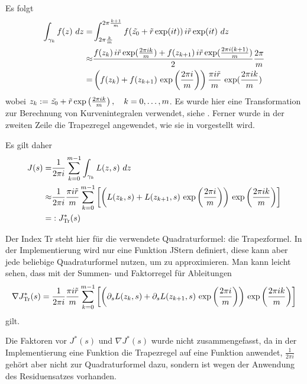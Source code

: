 \documentclass[a4paper,12pt]{report}
\newcommand{\zitat}[1]{\glqq #1\grqq}
\newcommand{\klammer}[1]{\left(#1\right)}
\newcommand{\1}{\mathds{1}}
\theoremstyle{plain} %
\theoremstyle{definition} %
\theoremstyle{remark}
\begin{document}
            Es folgt
            \begin{align}
                  \int_{\gamma_k} f(z)\ dz =& \int_{2 \pi \frac k m}^{2\pi \frac {k+1} m} f(\Tilde{z_0}+\Tilde r\exp(it))\,i\Tilde r\exp(it)\ dz\label{eqn: Teilintegral Kurve zu Intergral normal}\\
                  \approx& \frac{f(z_k)\,i\Tilde r\exp(\frac{2\pi i k}{m})+f(z_{k+1})\,i\Tilde r\exp(\frac{2\pi i (k+1)}{m})}{2} \frac{2\pi} m\nonumber\\
                  =& \klammer{f(z_k)+f(z_{k+1})\,\exp\klammer{\frac{2\pi i}{m}}}\frac{\pi i \Tilde r} m \,\exp(\frac{2\pi i k}{m})\nonumber
            \end{align}
            wobei $z_k:=\Tilde{z_0}+\Tilde r\exp\klammer{\frac {2\pi ik} m}, \quad k=0,\dots,m$.
            Es wurde hier eine Transformation zur Berechnung von Kurvenintegralen verwendet, siehe \cite[S. 21]{complexAnalysisVL}.
            Ferner wurde in der zweiten Zeile die Trapezregel angewendet, wie sie in \cite[S. 498]{numerikHermann} vorgestellt wird.
            
            Es gilt daher
            \begin{align}
                  J(s) =& \frac{1}{2\pi i}\sum_{k=0}^{m-1}\int_{\gamma_k} L(z,s)\ dz\nonumber\\
                  \approx& \frac{1}{2\pi i}\frac{\pi i \Tilde r} m\sum_{k=0}^{m-1}\left[\klammer{L(z_k, s)+
                  L(z_{k+1}, s)\,\exp\klammer{\frac{2\pi i}{m}}}\,\exp\klammer{\frac{2\pi i k}{m}}\right]\label{def: JSternTrapez}\\
                  =&:J_{\text{Tr}}^*(s)\nonumber
            \end{align}

            Der Index \zitat{Tr} steht hier für die verwendete Quadraturformel: die Trapezformel.
            In der Implementierung wird nur eine Funktion \zitat{JStern} definiert, diese kann aber jede beliebige Quadraturformel nutzen, um \J zu approximieren.
            Man kann leicht sehen, dass mit der Summen- und Faktorregel für Ableitungen
            $$\nabla J_{\text{Tr}}^*(s) = \frac{1}{2\pi i}\frac{\pi i \Tilde r} m\sum_{k=0}^{m-1}\left[\klammer{\partial_s L(z_k, s)+\partial_s L(z_{k+1}, s)\,
            \exp\klammer{\frac{2\pi i}{m}}}\,\exp\klammer{\frac{2\pi i k}{m}}\right]$$
            gilt.

            Die Faktoren vor $J^*(s)$ und $\nabla J^*(s)$ wurde nicht zusammengefasst, da in der Implementierung eine Funktion die Trapezregel auf eine Funktion anwendet,
            $\frac 1 {2\pi i}$ gehört aber nicht zur Quadraturformel dazu, sondern ist wegen der Anwendung des Residuensatzes vorhanden.
\end{document}
